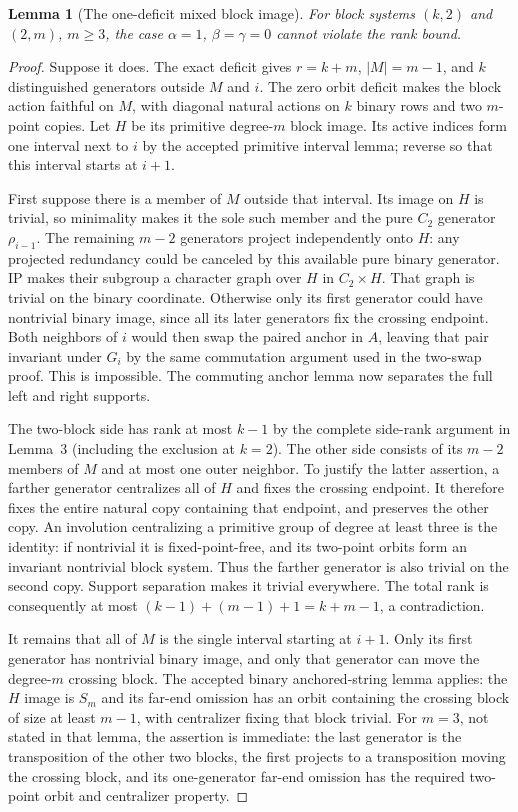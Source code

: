 \documentclass[11pt,a4paper]{article}
\newtheorem{lemma}{Lemma}
\begin{document}
\begin{lemma}[The one-deficit mixed block image]
For block systems $(k,2)$ and $(2,m)$, $m\geq3$, the case
$\alpha=1$, $\beta=\gamma=0$ cannot violate the rank bound.
\end{lemma}
\begin{proof}
Suppose it does. The exact deficit gives $r=k+m$,
$|M|=m-1$, and $k$ distinguished generators outside $M$ and $i$.
The zero orbit deficit makes the block action faithful on $M$,
with diagonal natural actions on $k$ binary rows and two
$m$-point copies. Let $H$ be its primitive degree-$m$ block
image. Its active indices form one interval next to $i$ by
the accepted primitive interval lemma; reverse so that this
interval starts at $i+1$.

First suppose there is a member of $M$ outside that interval.
Its image on $H$ is trivial, so minimality makes it the sole
such member and the pure $C_2$ generator $\rho_{i-1}$.
The remaining $m-2$ generators project independently onto $H$:
any projected redundancy could be canceled by this available
pure binary generator. IP makes their subgroup a character
graph over $H$ in $C_2\times H$.
That graph is trivial on the binary coordinate. Otherwise
only its first generator could have nontrivial binary image,
since all its later generators fix the crossing endpoint.
Both neighbors of $i$ would then swap the paired anchor in
$A$, leaving that pair invariant under $G_i$ by the same
commutation argument used in the two-swap proof. This is
impossible. The commuting anchor lemma now separates the full
left and right supports.

The two-block side has rank at most $k-1$ by the complete
side-rank argument in Lemma~3 (including the exclusion at $k=2$).
The other side consists of its $m-2$ members of $M$ and at
most one outer neighbor. To justify the latter assertion,
a farther generator centralizes all of $H$ and fixes the
crossing endpoint. It therefore fixes the entire natural
copy containing that endpoint, and preserves the other copy.
An involution centralizing a primitive group of degree at least
three is the identity: if nontrivial it is fixed-point-free,
and its two-point orbits form an invariant nontrivial block
system. Thus the farther generator is also trivial on the
second copy. Support separation makes it trivial everywhere.
The total rank is consequently at most
$(k-1)+(m-1)+1=k+m-1$, a contradiction.

It remains that all of $M$ is the single interval starting
at $i+1$. Only its first generator has nontrivial binary
image, and only that generator can move the degree-$m$
crossing block. The accepted binary anchored-string lemma
applies: the $H$ image is $S_m$ and its far-end omission has
an orbit containing the crossing block of size at least
$m-1$, with centralizer fixing that block trivial. For
$m=3$, not stated in that lemma, the assertion is immediate:
the last generator is the transposition of the other two
blocks, the first projects to a transposition moving the
crossing block, and its one-generator far-end omission has
the required two-point orbit and centralizer property.


\end{proof}
\end{document}
